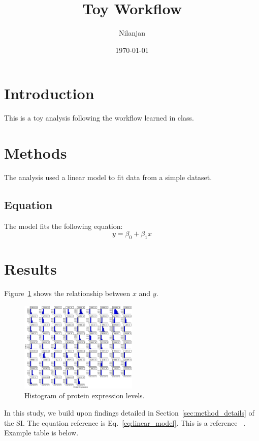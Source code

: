 \documentclass[letterpaper,11pt]{article}
\title{Toy Workflow}
\author{Nilanjan}
\date{\today}
\begin{document}
\maketitle

\section{Introduction}
This is a toy analysis following the workflow learned in class.

\section{Methods}
The analysis used a linear model to fit data from a simple dataset.

\subsection{Equation}
The model fits the following equation:
\begin{equation}
y = \beta_0 + \beta_1 x
\label{eq:linear_model}
\end{equation}

\section{Results}
Figure~\ref{fig:plot} shows the relationship between \(x\) and \(y\).

\begin{figure}[H]
    \centering
    \includegraphics[width=0.5\textwidth]{Results/protein_expression_histograms.png}
    \caption{Histogram of protein expression levels.}
    \label{fig:plot}
\end{figure}

In this study, we build upon findings detailed in Section~\ref{sec:method_details} of the SI. The equation reference is Eq.~\ref{eq:linear_model}. This is a reference ~\cite{example2023}. Example table is below.
\end{document}
